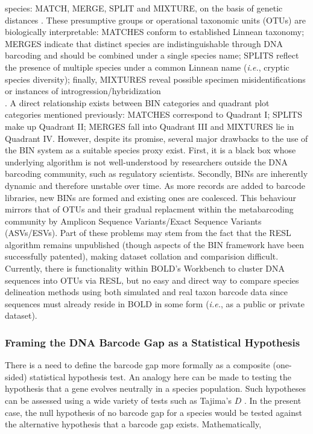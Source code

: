 species: MATCH, MERGE, SPLIT and MIXTURE, on the basis of genetic distances \cite{ratnasingham2013dna}. These presumptive groups or operational taxonomic units (OTUs) are biologically interpretable: MATCHES conform to established Linnean taxonomy; \\ MERGES indicate that distinct species are indistinguishable through DNA barcoding and should be combined under a single species name; SPLITS reflect the presence of multiple species under a common Linnean name (\textit{i.e.}, cryptic species diversity); finally, MIXTURES reveal possible specimen misidentifications or instances of introgression/hybridization \\ \cite{ratnasingham2013dna, serrao2014calibrating}. A direct relationship exists between BIN categories and quadrant plot \\ categories mentioned previously: MATCHES correspond to Quadrant I; SPLITS make up Quadrant II; MERGES fall into Quadrant III and MIXTURES lie in Quadrant IV. However, despite its promise, several major drawbacks to the use of the BIN system as a suitable species proxy exist. First, it is a black box whose underlying algorithm is not well-understood by researchers outside the DNA barcoding community, such as regulatory scientists. Secondly, BINs are inherently dynamic and therefore unstable over time. As more records are added to barcode libraries, new BINs are formed and existing ones are coalesced. This behaviour mirrors that of OTUs and their gradual replacment within the metabarcoding community by Amplicon Sequence Variants/Exact Sequence Variants (ASVs/ESVs). Part of these problems may stem from the fact that the RESL algorithm remains unpublished (though aspects of the BIN framework have been \\ successfully patented), making dataset collation and comparision difficult. Currently, there is functionality within BOLD's Workbench to cluster DNA sequences into OTUs via RESL, but no easy and direct way to compare species delineation methods using both simulated and real taxon barcode data since sequences must already reside in BOLD in some form (\textit{i.e.}, as a public or private dataset).



\subsubsection{Framing the DNA Barcode Gap as a Statistical Hypothesis}

There is a need to define the barcode gap more formally as a composite (one-sided) statistical hypothesis test. An analogy here can be made to testing the hypothesis that a gene evolves neutrally in a species population. Such hypotheses can be assessed using a wide variety of tests such as Tajima's $D$ \cite{tajima1983evolutionary}. In the present case, the null hypothesis of no barcode gap for a species would be tested against the alternative hypothesis that a barcode gap exists. Mathematically, 

